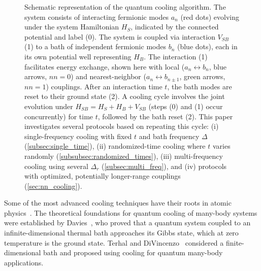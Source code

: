 \documentclass[aps,prx,twocolumn,superscriptaddress,nofootinbib,nolongbibliography,nobalancelastpage,10pt,floatfix]{revtex4-2}
\begin{document}
\begin{figure}
\begin{tikzpicture}
    \end{tikzpicture}
    \caption{Schematic representation of the quantum cooling algorithm. The system consists of interacting fermionic modes $a_n$ (red dots) evolving under the system Hamiltonian $H_S$, indicated by the connected potential and label (0). The system is coupled via interaction $V_{SB}$ (1) to a bath of independent fermionic modes $b_n$ (blue dots), each in its own potential well representing $H_B$. The interaction (1) facilitates energy exchange, shown here with local ($a_n \leftrightarrow b_n$, blue arrows, $nn=0$) and nearest-neighbor ($a_n \leftrightarrow b_{n\pm 1}$, green arrows, $nn=1$) couplings. After an interaction time $t$, the bath modes are reset to their ground state (2). A cooling cycle involves the joint evolution under $H_{SB} = H_S + H_B + V_{SB}$ (steps (0) and (1) occur concurrently) for time $t$, followed by the bath reset (2). This paper investigates several protocols based on repeating this cycle: (i) single-frequency cooling with fixed $t$ and bath frequency $\Delta$ (\cref{subsec:single_time}), (ii) randomized-time cooling where $t$ varies randomly (\cref{subsubsec:randomized_times}), (iii) multi-frequency cooling using several $\Delta_r$ (\cref{subsec:multi_freq}), and (iv) protocols with optimized, potentially longer-range couplings (\cref{sec:nn_cooling}).}
    \label{fig:cooling_strategies}
\end{figure}


Some of the most advanced cooling techniques have their roots in atomic physics~\cite{Hansch1975Cooling, Wineland1975Storage,Chu1998Nobel}. The theoretical foundations for quantum cooling of many-body systems were established by Davies~\cite{Davies1974Markovian}, who proved that a quantum system coupled to an infinite-dimensional thermal bath approaches its Gibbs state, which at zero temperature is the ground state. Terhal and DiVincenzo~\cite{Terhal2000Problem} considered a finite-dimensional bath and proposed using cooling for quantum many-body applications.
\end{document}
